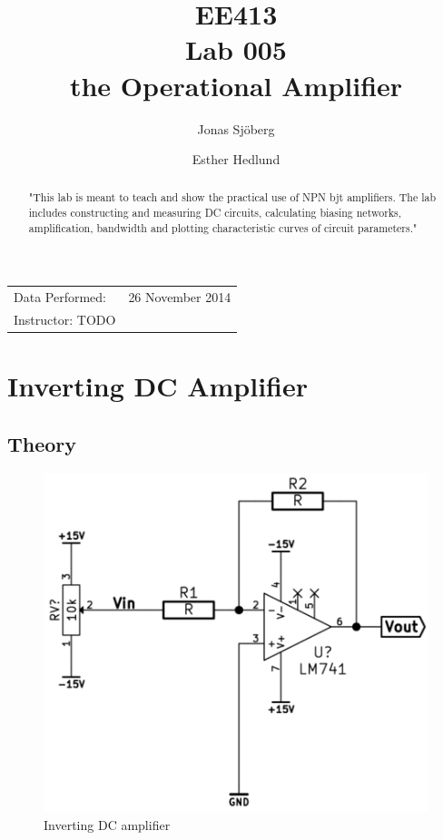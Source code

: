 \documentclass[]{article}
\title{EE413 \\ Lab 005 \\ the Operational Amplifier}
\author{{Jonas Sjöberg} \and {Esther Hedlund}}
\date{}
\begin{document}
\maketitle

\begin{center}
\begin{tabular}{l r}
Data Performed: & 26 November 2014 \\
Instructor: TODO
\end{tabular}
\end{center}

\begin{abstract}
"This lab is meant to teach and show the practical use of NPN bjt amplifiers.
The lab includes constructing and measuring DC circuits, calculating biasing networks,
amplification, bandwidth and plotting characteristic curves of circuit parameters."
\end{abstract}


\newpage

\section{Inverting DC Amplifier}\label{inverting-dc-amplifier}

\subsection{Theory}\label{theory}

\begin{figure}[htbp]
    \centering
        \includegraphics{img/invDCamp.png}
    \caption{Inverting DC amplifier}
    \label{fig:invDCamp}
\end{figure}
\end{document}
